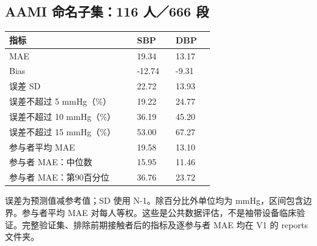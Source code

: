 \documentclass[11pt,letterpaper]{article}
\renewcommand{\arraystretch}{1.22}
\begin{document}
\subsection*{AAMI 命名子集：116 人／666 段}
{\small\renewcommand{\arraystretch}{1.05}

\par\smallskip
\begin{tabular}{@{}p{0.57\linewidth}p{0.17\linewidth}p{0.17\linewidth}@{}}\toprule
指标 & SBP & DBP\\\midrule
MAE & 19.34 & 13.17\\
Bias & -12.74 & -9.31\\
误差 SD & 22.72 & 13.93\\
误差不超过 5 mmHg（\%） & 19.22 & 24.77\\
误差不超过 10 mmHg（\%） & 36.19 & 45.20\\
误差不超过 15 mmHg（\%） & 53.00 & 67.27\\
参与者平均 MAE & 19.58 & 13.10\\
参与者 MAE：中位数 & 15.95 & 11.46\\
参与者 MAE：第90百分位 & 36.76 & 23.72\\
\bottomrule\end{tabular}\par\smallskip
}
误差为预测值减参考值；SD 使用 N-1。除百分比外单位均为 mmHg，区间包含边界。参与者平均 MAE 对每人等权。这些是公共数据评估，不是袖带设备临床验证。完整验证集、排除前期接触者后的指标及逐参与者 MAE 均在 V1 的 reports 文件夹。
\end{document}
